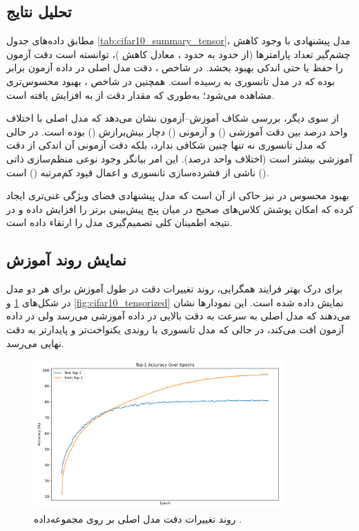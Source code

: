 \subsection{تحلیل نتایج}

مطابق داده‌های جدول \ref{tab:cifar10_summary_tensor}، مدل پیشنهادی با وجود کاهش چشم‌گیر تعداد پارامترها (از حدود  به حدود ، معادل کاهش )، توانسته است دقت آزمون را حفظ یا حتی اندکی بهبود بخشد.  
در شاخص ، دقت مدل اصلی در داده آزمون برابر  بوده که در مدل تانسوری به  رسیده است.  
همچنین در شاخص ، بهبود محسوس‌تری مشاهده می‌شود؛ به‌طوری که مقدار دقت از  به  افزایش یافته است.  

از سوی دیگر، بررسی شکاف آموزش–آزمون نشان می‌دهد که مدل اصلی با اختلاف  واحد درصد بین دقت آموزشی () و آزمونی () دچار بیش‌برازش () بوده است.  
در حالی که مدل تانسوری نه تنها چنین شکافی ندارد، بلکه دقت آزمونی آن اندکی از دقت آموزشی بیشتر است (اختلاف  واحد درصد).  
این امر بیانگر وجود نوعی منظم‌سازی ذاتی () ناشی از فشرده‌سازی تانسوری و اعمال قیود کم‌مرتبه () است.  

بهبود محسوس در  نیز حاکی از آن است که مدل پیشنهادی فضای ویژگی غنی‌تری ایجاد کرده که امکان پوشش کلاس‌های صحیح در میان پنج پیش‌بینی برتر را افزایش داده و در نتیجه اطمینان کلی تصمیم‌گیری مدل را ارتقاء داده است.

\subsection{نمایش روند آموزش}

برای درک بهتر فرایند همگرایی، روند تغییرات دقت  در طول آموزش برای هر دو مدل در شکل‌های \ref{fig:cifar10_swin_original} و \ref{fig:cifar10_tensorized} نمایش داده شده است.  
این نمودارها نشان می‌دهند که مدل اصلی به سرعت به دقت بالایی در داده آموزشی می‌رسد ولی در داده آزمون افت می‌کند، در حالی که مدل تانسوری با روندی یکنواخت‌تر و پایدارتر به دقت نهایی می‌رسد.

\begin{figure}[ht]
	\centering
	\includegraphics[width=0.85\textwidth]{transformer_images/results/cifar10_swin_original.png}
	\caption{روند تغییرات دقت  مدل اصلی  بر روی مجموعه‌داده .}
	\label{fig:cifar10_swin_original}
\end{figure}

